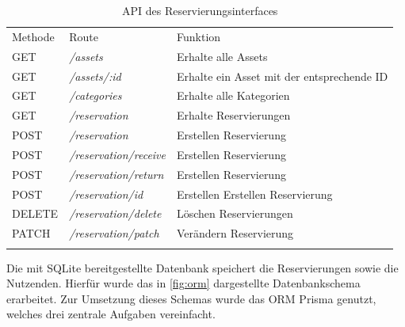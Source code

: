 \begin{table}[h]
  \centering
  \caption{API des Reservierungsinterfaces}
  \begin{tabular}{lll}
    \arrayrulecolor{maincolor}\hline
    \sffamily\color{maincolor}Methode & \sffamily\color{maincolor}Route &
    \sffamily\color{maincolor}Funktion
    \\
    \arrayrulecolor{maincolor}\hline
    GET                               & \textit{/assets}                &
    Erhalte alle Assets                                                   \\
    GET                               & \textit{/assets/:id}            &
    Erhalte ein Asset mit der entsprechende ID                            \\
    GET                               & \textit{/categories}            &
    Erhalte alle Kategorien                                               \\
    GET                               & \textit{/reservation}           &
    Erhalte Reservierungen                                                \\
    POST                              & \textit{/reservation}           &
    Erstellen Reservierung                                                \\
    POST                              & \textit{/reservation/receive}   &
    Erstellen Reservierung                                                \\
    POST                              & \textit{/reservation/return}    &
    Erstellen Reservierung                                                \\
    POST                              & \textit{/reservation/id}        &
    Erstellen Erstellen Reservierung                                      \\
    DELETE                            & \textit{/reservation/delete}    &
    Löschen Reservierungen                                                \\
    PATCH                             & \textit{/reservation/patch}     &
    Verändern Reservierung                                                \\
    \arrayrulecolor{maincolor}\hline
  \end{tabular}
  \label{table:impl-backend-routes}
\end{table}

Die mit SQLite bereitgestellte Datenbank speichert die Reservierungen sowie die
Nutzenden. Hierfür wurde das in \ref{fig:orm} dargestellte Datenbankschema
erarbeitet. Zur Umsetzung dieses Schemas wurde das ORM Prisma genutzt, welches
drei zentrale Aufgaben vereinfacht.

